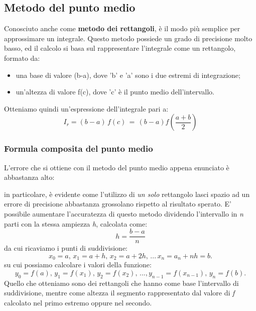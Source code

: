 \documentclass{article}
\begin{document}
\subsection{Metodo del punto medio}
Conosciuto anche come \textbf{metodo dei rettangoli}, è il modo più semplice per approssimare un integrale.
Questo metodo possiede un grado di precisione molto basso, ed il calcolo si basa sul rappresentare l'integrale come un rettangolo, formato da:
\begin{itemize}
   \item una base di valore (b-a), dove 'b' e 'a' sono i due estremi di integrazione;
   \item un'altezza di valore f(c), dove 'c' è il punto medio dell'intervallo.
\end{itemize}
Otteniamo quindi un'espressione dell'integrale pari a:
\begin{equation*}
   I_{r} = (b-a)\,f(c)\,=\,(b-a)f \left( \frac{a+b}{2}  \right)
\end{equation*}
\subsubsection{Formula composita del punto medio}
L'errore che si ottiene con il metodo del punto medio appena enunciato è abbastanza alto:
   \begin{comment}
      e si può calcolare come:
      \begin{equation*}
      \varepsilon = \int_{a}^{b} f(x) dx - I_r = \frac{(b-a)^3}{24}f''(\varepsilon)
      \end{equation*}
       In particolare, è lampante come l'utilizzo di \textit{un solo} rettangolo lasci spazio ad una mancanza di precisione abbastanza grossolana rispetto al risultato sperato.
   \end{comment}
in particolare, è evidente come l'utilizzo di \textit{un solo} rettangolo lasci spazio ad un errore di precisione abbastanza grossolano rispetto al risultato sperato.
E' possibile aumentare l'accuratezza di questo metodo dividendo l'intervallo in \textit{n} parti con  la stessa ampiezza \textit{h}, calcolata come:
\begin{equation*}
   h = \frac{b-a}{n}
\end{equation*}
da cui ricaviamo i punti di suddivisione:
\begin{equation*}
   x_0 = a,\,x_1 = a+h,\, x_2 = a + 2h,\,...\,x_n = a_n + nh = b.
\end{equation*}
su cui possiamo calcolare i valori della funzione:
\begin{equation*}
   y_0 = f(a),\,y_1 = f(x_1),\,y_2 = f(x_2),\,...,y_{n-1} = f(x_{n-1}),\,y_n = f(b).
\end{equation*}
Quello che otteniamo sono dei rettangoli che hanno come base l'intervallo di suddivisione, mentre come altezza il segmento rappresentato dal valore di \textit{f} calcolato 
nel primo estremo oppure nel secondo.
\end{document}

